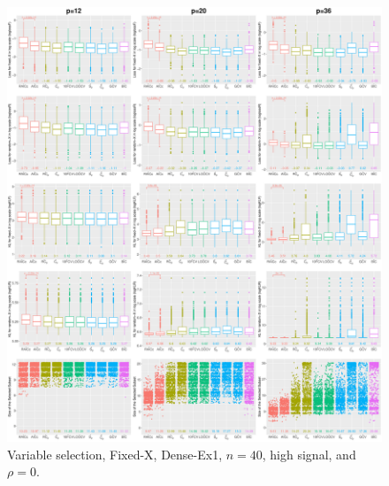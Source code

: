\begin{figure}[!ht]
\centering
\includegraphics[width=\textwidth]{figures/supplement/fixedx/subset_selection/Dense-Ex1_n40_hsnr_rho0.eps}
\caption{Variable selection, Fixed-X, Dense-Ex1, $n=40$, high signal, and $\rho=0$.}
\end{figure}
\clearpage
